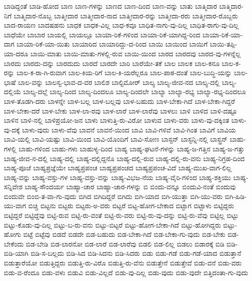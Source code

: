 {ಬಾಡಿದ್ದಂತೆ
ಬಾಡಿ-ಹೋದ
ಬಾಣ
ಬಾಣ-ಗಳನ್ನು
ಬಾಣದ
ಬಾಣ-ದಿಂದ
ಬಾಣ-ವನ್ನು
ಬಾತು
ಬಾತ್ಮಿದಾರ
ಬಾತ್ಮಿದಾರ-ನಿಗೆ
ಬಾತ್ಮಿದಾರ-ನೊಬ್ಬ
ಬಾತ್ಮೀದಾರ
ಬಾತ್ಮೀದಾರ-ನಾದ
ಬಾತ್ಮೀದಾರ-ರನ್ನು
ಬಾತ್ಮೀದಾ-ರರು
ಬಾತ್ಮೀದಾರ-ರೊಬ್ಬರು
ಬಾದ-ರಾಯಣ
ಬಾದಷಹನು
ಬಾಧಕ
ಬಾಧಕ-ವಿಲ್ಲ
ಬಾಧ-ಕವೂ
ಬಾಧಿತ-ನಾಗು-ವು-ದಿಲ್ಲ
ಬಾಧಿತ-ರಾಗು-ವು-ದಿಲ್ಲ
ಬಾಧೆಯೇ
ಬಾಬಾರ
ಬಾಯಲ್ಲಿ
ಬಾಯಲ್ಲೂ
ಬಾಯಾ-ರಿಕೆ-ಗಳಿಂದ
ಬಾಯಾ-ರಿಕೆ-ಯಾಗಿದ್ದ-ರಿಂದ
ಬಾಯಾ-ರಿಕೆ-ಯಾ-ದಾಗ
ಬಾಯಾ-ರಿಕೆ-ಯಾ-ಯಿತು
ಬಾಯಾರಿದ
ಬಾಯಾರಿದ್ದು-ದ-ರಿಂದ
ಬಾಯಿ
ಬಾಯಿಂದ
ಬಾಯಿಗೆ
ಬಾಯಿ-ತಪ್ಪಿ-ಯಾ-ದರೂ
ಬಾಯಿ-ಮಾತು
ಬಾಯಿ-ಮಾತು-ಗಳಲ್ಲಿ-ರುವ
ಬಾಯಿ-ಯಿಂದ
ಬಾರದ
ಬಾರದವು
ಬಾರದ-ವು-ಗಳನ್ನೆಲ್ಲ
ಬಾರದು
ಬಾರದು-ದನ್ನು
ಬಾರದುದು
ಬಾರದೆ
ಬಾರದೇ
ಬಾರಿ
ಬಾರೆಯೇ-ತಕೆ
ಬಾಲ
ಬಾಲಕ
ಬಾಲ-ಕನೂ
ಬಾಲ-ಕ-ರನ್ನು
ಬಾಲ-ಕ-ರಾ-ಗಿ-ರುವಾಗ
ಬಾಲ-ಕಿಯ-ರಿಗೆ
ಬಾಲ-ಕಿ-ಯರೆಲ್ಲರೂ
ಬಾಲ-ಪಾಠ-ದಂತೆ
ಬಾಲ-ಬುದ್ಧಿ-ಯನ್ನು
ಬಾಲ-ಭಾಷೆ
ಬಾಲ-ವನ್ನು
ಬಾಲಸ್ವ-ಭಾವ-ದ-ವರ
ಬಾಲಿಶ
ಬಾಲ್ಟಿಮೋರ್
ಬಾಲ್ಯ
ಬಾಲ್ಯ-ಜೀವ-ನದ
ಬಾಲ್ಯ-ದಲ್ಲಿ
ಬಾಲ್ಯ-ದಲ್ಲಿಯೆ
ಬಾಲ್ಯ-ದಲ್ಲೆ
ಬಾಲ್ಯ-ದಿಂದ
ಬಾಲ್ಯ-ದಿಂದಲೂ
ಬಾಲ್ಯ-ದಿಂದಲೇ
ಬಾಲ್ಯಾ
ಬಾಲ್ಯಾ-ರಭ್ಯ
ಬಾಲ್ಯಾ-ರಭ್ಯ-ದಿಂದಲೂ
ಬಾಳ-ತೊಡಗಿ-ದರು
ಬಾಳನ್ನೇ
ಬಾಳ-ಬಲ್ಲ
ಬಾಳ-ಬಲ್ಲವು
ಬಾಳ-ಬಹುದು
ಬಾಳ-ಬೇಕಾ-ಗಿದೆ
ಬಾಳ-ಬೇಕಾ-ಗಿದ್ದರೆ
ಬಾಳ-ಬೇಕಾ-ದರೆ
ಬಾಳ-ಬೇಕು
ಬಾಳ-ಲಾ-ರವು
ಬಾಳ-ಲಾರೆ
ಬಾಳ-ಲಾರೆವು
ಬಾಳಲು
ಬಾಳಿ
ಬಾಳಿದ
ಬಾಳಿ-ದಷ್ಟೂ
ಬಾಳಿನ
ಬಾಳಿ-ನಲ್ಲಿ
ಬಾಳಿಪ್ರಯೋ-ಜನ
ಬಾಳು
ಬಾಳುತ್ತಿ-ರು-ವಿರೋ
ಬಾಳುವ
ಬಾಳು-ವರು
ಬಾಳು-ವು-ದಕ್ಕಿಂತ
ಬಾಳು-ವು-ದಕ್ಕೆ
ಬಾಳು-ವುದು
ಬಾಳು-ವೆವು
ಬಾವನೆ
ಬಾವನೆ-ಯಿಂದ
ಬಾವಿ
ಬಾವಿ-ಗಳಿವೆ
ಬಾವಿ-ಗಿಂತ
ಬಾವಿಗೆ
ಬಾವಿಯ
ಬಾವಿ-ಯಲ್ಲಿ
ಬಾವಿ-ಯಷ್ಟು
ಬಾವಿ-ಯಿಂದ
ಬಾವಿ-ಯೊಂದಿಗೆ
ಬಾವಿ-ಸೋಣ
ಬಾಸ್ಟನ್
ಬಾಸ್ಟನ್ನಿ-ನಲ್ಲಿ
ಬಾಸ್ಟ್ರನ್
ಬಾಹು-ಗಳಲ್ಲಿ
ಬಾಹು-ಗಳಿಂದ
ಬಾಹು-ಗಳು
ಬಾಹುಳ್ಯ-ದಿಂದ
ಬಾಹ್ಯ
ಬಾಹ್ಯ-ಘಟನೆ-ಗಳನ್ನು
ಬಾಹ್ಯ-ಜ-ಗತ್ತಿನ
ಬಾಹ್ಯ-ಜ-ಗತ್ತು
ಬಾಹ್ಯ-ಜೀವ-ನ-ದಲ್ಲಿ
ಬಾಹ್ಯ-ದಲ್ಲಿ
ಬಾಹ್ಯ-ದಲ್ಲಿದ್ದನೊ
ಬಾಹ್ಯ-ದಲ್ಲಿ-ರುವ
ಬಾಹ್ಯ-ದಲ್ಲಿ-ರು-ವನು
ಬಾಹ್ಯ-ನಿಗ್ರಹ-ದಿಂದ
ಬಾಹ್ಯ-ಪೂಜೆ
ಬಾಹ್ಯಪ್ರಜ್ಞೆಯೇ
ಬಾಹ್ಯಪ್ರಪಂಚ
ಬಾಹ್ಯಪ್ರಪಂಚದ
ಬಾಹ್ಯಪ್ರಪಂಚ-ವಿದೆ
ಬಾಹ್ಯ-ಮುಖ-ವಾಗ-ಲಿಲ್ಲ
ಬಾಹ್ಯ-ವನ್ನು
ಬಾಹ್ಯ-ವಸ್ತು-ಗಳ
ಬಾಹ್ಯ-ವಸ್ತು-ವನ್ನು
ಬಾಹ್ಯ-ವಿಭಜ-ನೆಯ
ಬಾಹ್ಯ-ವೈರಿ-ಗಳಿಂದ
ಬಾಹ್ಯ-ಶಕ್ತಿಯು
ಬಾಹ್ಯ-ಸನ್ನಿವೇಶ
ಬಾಹ್ಯ-ಸೌಂದರ್ಯ
ಬಾಹ್ಯಾ-ಚಾರ
ಬಾಹ್ಯಾ-ಚಾರ-ಗಳನ್ನು
ಬಿ
ಬಿಂದು-ವನ್ನೂ
ಬಿಂದುವಿ-ನಂತೆ
ಬಿಂದುವು
ಬಿಂದುವೇ
ಬಿಂಬಿ-ತ-ವಾ-ಗು-ವುದು
ಬಿಗಿದ
ಬಿಗಿದಿದ್ದರೆ
ಬಿಗಿದು
ಬಿಗಿ-ಯಾದ
ಬಿಗಿ-ಯುತ್ತಾ
ಬಿಗಿ-ಯು-ವರು
ಬಿಗಿ-ಹಿಡಿ-ಯು-ವಾಗ
ಬಿಚ್ಚಿ
ಬಿಟ್ಟನು
ಬಿಟ್ಟರು
ಬಿಟ್ಟರು-ಅ-ವರು
ಬಿಟ್ಟರೆ
ಬಿಟ್ಟ-ಹೋಗ-ಬೇಕಾದ
ಬಿಟ್ಟಾಗ
ಬಿಟ್ಟಾಳು
ಬಿಟ್ಟಿದ್ದರು
ಬಿಟ್ಟಿದ್ದರೆ
ಬಿಟ್ಟಿದ್ದೆವು
ಬಿಟ್ಟಿ-ರುವ
ಬಿಟ್ಟಿ-ರು-ವಂತೆ
ಬಿಟ್ಟಿ-ರು-ವರು
ಬಿಟ್ಟಿ-ರು-ವು-ದನ್ನು
ಬಿಟ್ಟಿ-ರು-ವೆವು
ಬಿಟ್ಟಿಲ್ಲ
ಬಿಟ್ಟು
ಬಿಟ್ಟು-ಕೊಡು-ವು-ದಿಲ್ಲ
ಬಿಟ್ಟು-ಬ-ರು-ವನು
ಬಿಟ್ಟು-ಬಿಟ್ಟರೆ
ಬಿಟ್ಟು-ಹೋಗ-ಬೇಕಾ-ಗಿದೆ
ಬಿಟ್ಟು-ಹೋಗಿದ್ದರು
ಬಿಟ್ಟು-ಹೋಗು
ಬಿಟ್ಟೆ
ಬಿಟ್ಟೆವು
ಬಿಡದೆ
ಬಿಡದೇ
ಬಿಡ-ಬಹುದು
ಬಿಡ-ಬೇಕಾ-ಗಿದೆ
ಬಿಡ-ಬೇಕಾ-ಗು-ವುದು
ಬಿಡ-ಬೇಕು
ಬಿಡ-ಬೇಕೆಂದು
ಬಿಡ-ಬೇಡಿ
ಬಿಡ-ಲಾರನೋ
ಬಿಡ-ಲಾರೆ
ಬಿಡ-ಲಾರೆವು
ಬಿಡಲಿ
ಬಿಡ-ಲಿಲ್ಲ
ಬಿಡಲು
ಬಿಡಾರಕ್ಕೆ
ಬಿಡಿ
ಬಿಡಿ-ಬಿಡಿ-ಯಾಗಿ
ಬಿಡಿ-ಸ-ಬಲ್ಲದು
ಬಿಡಿ-ಸಿದ
ಬಿಡಿ-ಸಿದನು
ಬಿಡಿ-ಸಿದರು
ಬಿಡು
ಬಿಡು-ಗಡೆ
ಬಿಡು-ಗಡೆ-ಯಾದ
ಬಿಡುತ್ತಾನೆ
ಬಿಡುತ್ತಾರೆಯೋ
ಬಿಡುತ್ತಿದ್ದರು
ಬಿಡುತ್ತಿ-ರು-ವಿರೊ
ಬಿಡುತ್ತಿ-ರು-ವೆನು
ಬಿಡುತ್ತೇನೆ
ಬಿಡುತ್ತೇವೆ
ಬಿಡು-ವನೆ
ಬಿಡು-ವರು
ಬಿಡು-ವ-ರೆಂದೂ
ಬಿಡು-ವಳು
ಬಿಡುವಿ
ಬಿಡು-ವಿಲ್ಲದೆ
ಬಿಡು-ವು-ದಿಲ್ಲ
ಬಿಡು-ವುದು
ಬಿಡು-ವುದೇ
ಬಿತ್ತಿದಂತಾ-ಗು-ವುದು
}
